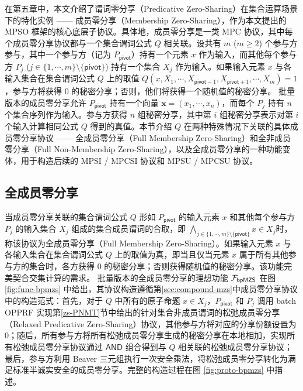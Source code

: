 在第五章中，本文介绍了谓词零分享（Predicative Zero-Sharing）在集合运算场景下的特化实例 —— 成员零分享（Membership Zero-Sharing），作为本文提出的 MPSO 框架的核心底层子协议。具体地，成员零分享是一类 MPC 协议，其中每个成员零分享协议都与一个集合谓词公式 $Q$ 相关联。设共有 $m$ ($m \ge 2$) 个参与方参与，其中一个参与方（记为 $P_\mathsf{pivot}$）持有一个元素 $x$ 作为输入，而其他每个参与方 $P_j$ ($j \in \{1,\cdots,m\} \setminus \{\mathsf{pivot}\}$) 持有一个集合 $X_j$ 作为输入。如果输入元素 $x$ 与各输入集合在集合谓词公式 $Q$ 上的取值 $Q(x,X_1,\cdots,X_{\mathsf{pivot}-1},X_{\mathsf{pivot}+1},\cdots, X_m) = 1$，参与方将获得 $0$ 的秘密分享；否则，他们将获得一个随机值的秘密分享。
批量版本的成员零分享允许 $P_\mathsf{pivot}$ 持有一个向量 $\textbf{x} = (x_1, \cdots, x_n)$，而每个 $P_j$ 持有 $n$ 个集合序列作为输入。参与方获得 $n$ 组秘密分享，其中第 $i$ 组秘密分享表示对第 $i$ 个输入计算相同公式 $Q$ 得到的真值。本节介绍 $Q$ 在两种特殊情况下关联的具体成员零分享协议 —— 全成员零分享（Full Membership Zero-Sharing）和全非成员零分享（Full Non-Membership Zero-Sharing），以及全成员零分享的一种功能变体，用于构造后续的 MPSI / MPCSI 协议和 MPSU / MPCSU 协议。

\subsection{全成员零分享}

当成员零分享关联的集合谓词公式 $Q$ 形如 $P_\mathsf{pivot}$ 的输入元素 $x$ 和其他每个参与方 $P_j$ 的输入集合 $X_j$ 组成的集合成员谓词的合取，即 $\bigwedge_{j \in \{1,\cdots,m\} \setminus \{\mathsf{pivot}\}} x \in X_j$时，称该协议为全成员零分享（Full Membership Zero-Sharing）。如果输入元素 $x$ 与各输入集合在集合谓词公式 $Q$ 上的取值为真，即当且仅当元素 $x$ 属于所有其他参与方的集合时，各方获得 $0$ 的秘密分享；否则获得随机值的秘密分享。该功能完美契合交集计算的需求。
批量版本的全成员零分享的理想功能 $\mathcal{F}_\mathsf{bpMZS}$ 在图 \ref{fig:func-bpmzs} 中给出，其协议构造遵循第\ref{sec:compound-mzs}中成员零分享协议中的构造范式：首先，对于 $Q$ 中所有的原子命题 $x \in X_j$，$P_\mathsf{pivot}$ 和 $P_j$ 调用 batch OPPRF 实现第\ref{zs-PNMT}节中给出的针对集合非成员谓词的松弛成员零分享（Relaxed Predicative Zero-Sharing）协议，其他参与方将对应的分享份额设置为 $0$；随后，所有参与方将所有松弛成员零分享生成的秘密分享在本地相加，实现所有松弛成员零分享协议通过 $\mathsf{AND}$ 组合得到与 $Q$ 相关联的松弛成员零分享协议；最后，参与方利用 Beaver 三元组执行一次安全乘法，将松弛成员零分享转化为满足标准半诚实安全的成员零分享。完整的构造过程在图 \ref{fig:proto-bpmzs} 中描述。

